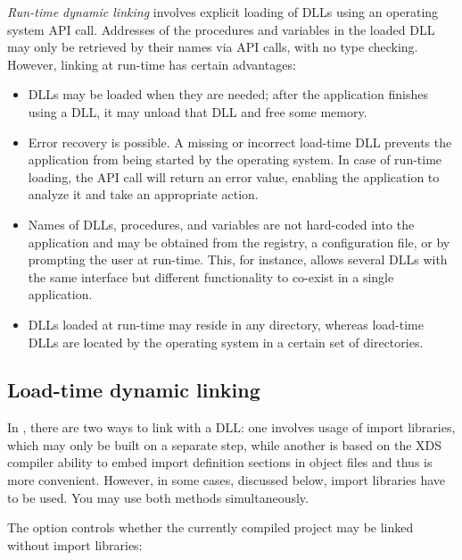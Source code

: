 {\em Run-time dynamic linking} involves explicit loading of DLLs using
an operating system API call. Addresses of the procedures and variables
in the loaded DLL may only be retrieved by their names via API calls,
with no type checking. However, linking at run-time has certain advantages:

\begin{itemize}
\item DLLs may be loaded when they are needed; after the application
      finishes using a DLL, it may unload that DLL and free some memory.
\item Error recovery is possible. A missing or incorrect load-time DLL
      prevents the application from being started by the operating system.
      In case of run-time loading, the API call will return an error
      value, enabling the application to analyze it and take an
      appropriate action.
\item Names of DLLs, procedures, and variables are not hard-coded into
      the application and may be obtained from the registry,
      a configuration file, or by prompting the user at run-time.
      This, for instance, allows several DLLs with the same interface
      but different functionality to co-exist in a single application.
\item DLLs loaded at run-time may reside in any directory, whereas load-time
      DLLs are located by the operating system in a certain set
      of directories.
\end{itemize}

\subsection{Load-time dynamic linking}
\label{dll:using:load-time}

In \XDS{}, there are two ways to link with a DLL: one involves usage of import libraries,
which may only be built on a separate step, while another is based on the XDS compiler
ability to embed import definition sections in object files and thus is more convenient.
However, in some cases, discussed below, import libraries have to be used. You may use
both methods simultaneously.

The  option controls whether the currently compiled project
may be linked without import libraries:

